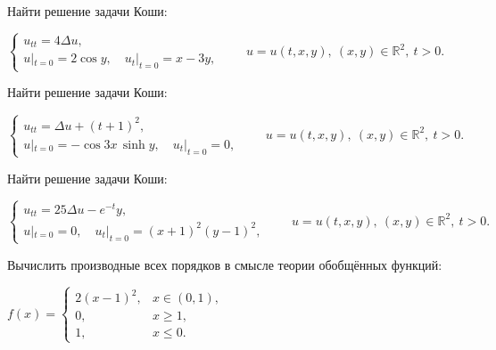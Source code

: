\begin{cond}
	Найти решение задачи Коши:

	\(
	\begin{cases}
		u_{tt} = 4\Delta u, \\
		u|_{t=0} = 2\cos y,\quad u_t|_{t=0} = x - 3y,
	\end{cases}
	\qquad
	u = u(t,x,y),\ (x,y)\in\mathbb{R}^2,\ t>0.
	\)
\end{cond}

\begin{cond}
	Найти решение задачи Коши:

	\(
	\begin{cases}
		u_{tt} = \Delta u + (t+1)^2, \\
		u|_{t=0} = -\cos 3x\,\sinh y,\quad u_t|_{t=0} = 0,
	\end{cases}
	\qquad
	u = u(t,x,y),\ (x,y)\in\mathbb{R}^2,\ t>0.
	\)
\end{cond}

\begin{cond}
	Найти решение задачи Коши:

	\(
	\begin{cases}
		u_{tt} = 25\Delta u - e^{-t}y, \\
		u|_{t=0} = 0,\quad u_t|_{t=0} = (x+1)^2 (y-1)^2,
	\end{cases}
	\qquad
	u = u(t,x,y),\ (x,y)\in\mathbb{R}^2,\ t>0.
	\)
\end{cond}





















\begin{cond}
	Вычислить производные всех порядков в смысле теории обобщённых функций:

	\(
	f(x) =
	\begin{cases}
		2(x-1)^2, & x \in (0,1), \\
		0,        & x \ge 1,     \\
		1,        & x \le 0.
	\end{cases}
	\)
\end{cond}



